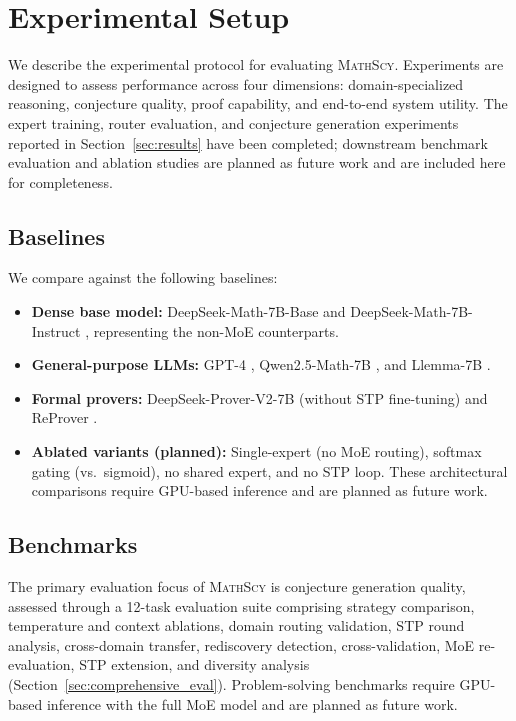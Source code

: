 \documentclass[11pt,a4paper]{article}
\newcommand{\mathscy}{\textsc{MathScy}}
\begin{document}
\section{Experimental Setup}
\label{sec:experimental_setup}

We describe the experimental protocol for evaluating \mathscy{}. Experiments are designed to assess performance across four dimensions: domain-specialized reasoning, conjecture quality, proof capability, and end-to-end system utility. The expert training, router evaluation, and conjecture generation experiments reported in Section~\ref{sec:results} have been completed; downstream benchmark evaluation and ablation studies are planned as future work and are included here for completeness.

\subsection{Baselines}

We compare against the following baselines:
\begin{itemize}[leftmargin=*]
    \item \textbf{Dense base model:} DeepSeek-Math-7B-Base and DeepSeek-Math-7B-Instruct \citep{shao2024deepseekmath}, representing the non-MoE counterparts.
    \item \textbf{General-purpose LLMs:} GPT-4 \citep{achiam2024gpt4}, Qwen2.5-Math-7B \citep{yang2024qwen25math}, and Llemma-7B \citep{azerbayev2024llemma}.
    \item \textbf{Formal provers:} DeepSeek-Prover-V2-7B \citep{xin2024deepseekproverv2} (without STP fine-tuning) and ReProver \citep{yang2024leandojo}.
    \item \textbf{Ablated variants (planned):} Single-expert (no MoE routing), softmax gating (vs.\ sigmoid), no shared expert, and no STP loop. These architectural comparisons require GPU-based inference and are planned as future work.
\end{itemize}

\subsection{Benchmarks}

The primary evaluation focus of \mathscy{} is conjecture generation quality, assessed through a 12-task evaluation suite comprising strategy comparison, temperature and context ablations, domain routing validation, STP round analysis, cross-domain transfer, rediscovery detection, cross-validation, MoE re-evaluation, STP extension, and diversity analysis (Section~\ref{sec:comprehensive_eval}). Problem-solving benchmarks require GPU-based inference with the full MoE model and are planned as future work.
\end{document}
